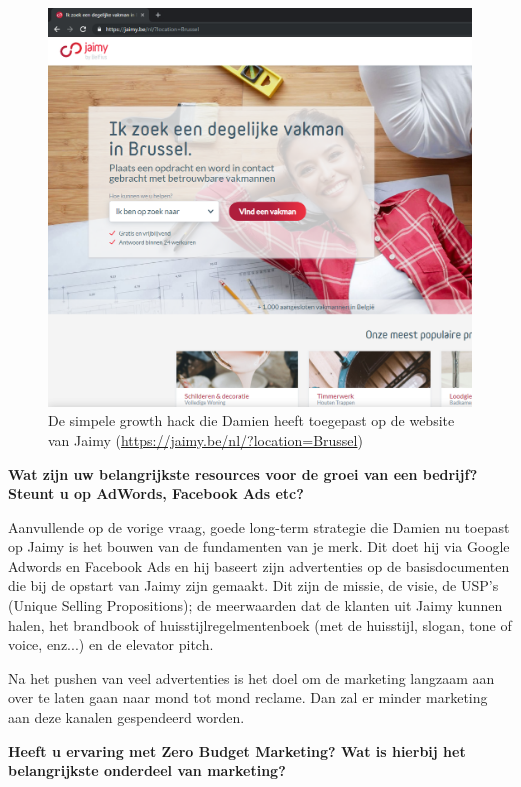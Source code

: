 \begin{figure}[h!]
	\includegraphics[width=\linewidth]{img/location-growth-hack.png}
	\caption{De simpele growth hack die Damien heeft toegepast op de website van Jaimy (\href{https://jaimy.be/nl/?location=Brussel}{https://jaimy.be/nl/?location=Brussel})}
	\label{fig:fantalism}
\end{figure}
	
\textbf{Wat zijn uw belangrijkste resources voor de groei van een bedrijf? Steunt u op AdWords, Facebook Ads etc?}
	
Aanvullende op de vorige vraag, goede long-term strategie die Damien nu toepast op Jaimy is het bouwen van de fundamenten van je merk. Dit doet hij via Google Adwords en Facebook Ads en hij baseert zijn advertenties op de basisdocumenten die bij de opstart van Jaimy zijn gemaakt. Dit zijn de missie, de visie, de USP's (Unique Selling Propositions); de meerwaarden dat de klanten uit Jaimy kunnen halen, het brandbook of huisstijlregelmentenboek (met de huisstijl, slogan, tone of voice, enz...) en de elevator pitch. 

Na het pushen van veel advertenties is het doel om de marketing langzaam aan over te laten gaan naar mond tot mond reclame. Dan zal er minder marketing aan deze kanalen gespendeerd worden. 

\textbf{Heeft u ervaring met Zero Budget Marketing? Wat is hierbij het belangrijkste onderdeel van marketing?}
	
